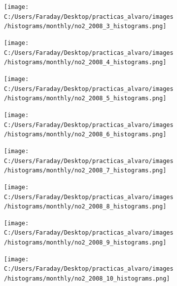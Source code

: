 \documentclass[12pt]{article}
\begin{document}
\begin{figure}[H]
\centering
\begin{subfigure}[h]{0.45\textwidth}
\texttt{[image: C:/Users/Faraday/Desktop/practicas\_alvaro/images/histograms/monthly/no2\_2008\_3\_histograms.png]}
\caption{}
\label{fig:hist-mon-1-3-2008}
\end{subfigure}
%
\begin{subfigure}[H]{0.45\textwidth}
\texttt{[image: C:/Users/Faraday/Desktop/practicas\_alvaro/images/histograms/monthly/no2\_2008\_4\_histograms.png]}
\caption{}
\label{fig:hist-mon-1-4-2008}
\end{subfigure}
\caption{}
\end{figure}

\begin{figure}[H]
\centering
\begin{subfigure}[h]{0.45\textwidth}
\texttt{[image: C:/Users/Faraday/Desktop/practicas\_alvaro/images/histograms/monthly/no2\_2008\_5\_histograms.png]}
\caption{}
\label{fig:hist-mon-1-5-2008}
\end{subfigure}
%
\begin{subfigure}[H]{0.45\textwidth}
\texttt{[image: C:/Users/Faraday/Desktop/practicas\_alvaro/images/histograms/monthly/no2\_2008\_6\_histograms.png]}
\caption{}
\label{fig:hist-mon-1-6-2008}
\end{subfigure}
\caption{}
\end{figure}

\newpage

\begin{figure}[H]
\centering
\begin{subfigure}[h]{0.45\textwidth}
\texttt{[image: C:/Users/Faraday/Desktop/practicas\_alvaro/images/histograms/monthly/no2\_2008\_7\_histograms.png]}
\caption{}
\label{fig:hist-mon-1-7-2008}
\end{subfigure}
%
\begin{subfigure}[H]{0.45\textwidth}
\texttt{[image: C:/Users/Faraday/Desktop/practicas\_alvaro/images/histograms/monthly/no2\_2008\_8\_histograms.png]}
\caption{}
\label{fig:hist-mon-1-8-2008}
\end{subfigure}
\caption{}
\end{figure}

\begin{figure}[H]
\centering
\begin{subfigure}[h]{0.45\textwidth}
\texttt{[image: C:/Users/Faraday/Desktop/practicas\_alvaro/images/histograms/monthly/no2\_2008\_9\_histograms.png]}
\caption{}
\label{fig:hist-mon-1-9-2008}
\end{subfigure}
%
\begin{subfigure}[H]{0.45\textwidth}
\texttt{[image: C:/Users/Faraday/Desktop/practicas\_alvaro/images/histograms/monthly/no2\_2008\_10\_histograms.png]}
\caption{}
\label{fig:hist-mon-1-10-2008}
\end{subfigure}
\caption{}
\end{figure}
\end{document}
